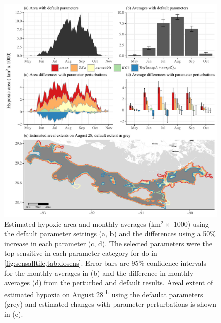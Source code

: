 \documentclass[preprint]{elsarticle}\usepackage[]{graphicx}\usepackage[]{color}
\newcommand{\beginsupplement}{%
        \setcounter{table}{0}
        \renewcommand{\thetable}{S\arabic{table}}%
        \setcounter{figure}{0}
        \renewcommand{\thefigure}{S\arabic{figure}}%
     }
\begin{document}
\begin{figure}[!ht]

{\centering \includegraphics[width=\textwidth]{figs/areachg-1} 

}

\caption{Estimated hypoxic area and monthly averages (km$^2 \times$ 1000) using the default parameter settings (a, b) and the differences using a 50\% increase in each parameter (c, d).  The selected parameters were the top sensitive in each parameter category for \ac{do} in \cref{fig:sensalltile,tab:dosens}. Error bars are 95\% confidence intervals for the monthly averages in (b) and the difference in monthly averages (d) from the perturbed and default results.  Areal extent of estimated hypoxia on August 28\textsuperscript{th} using the defaulat parameters (grey) and estimated changes with parameter perturbations is shown in (e).}\label{fig:areachg}
\end{figure}



\clearpage

\beginsupplement

\end{document}
